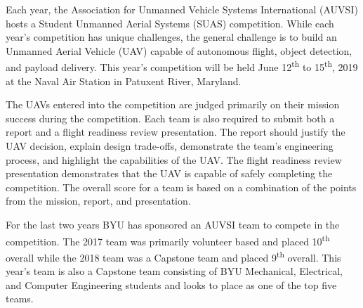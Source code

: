
Each year, the Association for Unmanned Vehicle Systems International (AUVSI) hosts a Student Unmanned Aerial Systems (SUAS) competition. While each year's competition has unique challenges, the general challenge is to build an Unmanned Aerial Vehicle (UAV) capable of autonomous flight, object detection, and payload delivery. This year's competition will be held June 12\textsuperscript{th} to 15\textsuperscript{th}, 2019 at the Naval Air Station in Patuxent River, Maryland.

The UAVs entered into the competition are judged primarily on their mission success during the competition. Each team is also required to submit both a report and a flight readiness review presentation. The report should justify the UAV decision, explain design trade-offs, demonstrate the team's engineering process, and highlight the capabilities of the UAV. The flight readiness review presentation demonstrates that the UAV is capable of safely completing the competition. The overall score for a team is based on a combination of the points from the mission, report, and presentation.

For the last two years BYU has sponsored an AUVSI team to compete in the competition. The 2017 team was primarily volunteer based and placed 10\textsuperscript{th} overall while the 2018 team was a Capstone team and placed 9\textsuperscript{th} overall. This year's team is also a Capstone team consisting of BYU Mechanical, Electrical, and Computer Engineering students and looks to place as one of the top five teams.
